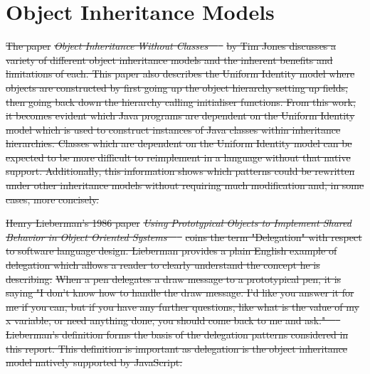 \documentclass[11pt
              , a4paper
              , twoside
              , openright
              ]{report}
\providecommand{\DIFdel}[1]{{\protect\color{red}\sout{#1}}}                      %
\providecommand{\DIFdelbegin}{} %
\begin{document}
\section{Object Inheritance Models}
\DIFdelbegin \DIFdel{The paper }\textit{\DIFdel{Object Inheritance Without Classes~\mbox{%
\cite{InheritanceWithoutClasses}
}%
}} %
\DIFdel{by Tim Jones discusses a variety of different object inheritance models and the inherent benefits and limitations of each. This paper also describes the Uniform Identity model where objects are constructed by first going up the object hierarchy setting up fields, then going back down the hierarchy calling initialiser functions. From this work, it becomes evident which Java programs are dependent on the Uniform Identity model which is used to construct instances of Java classes within inheritance hierarchies. Classes which are dependent on the Uniform Identity model can be expected to be more difficult to reimplement in a language without that native support. Additionally, this information shows which patterns could be rewritten under other inheritance models without requiring much modification and, in some cases, more concisely.
}%

\DIFdel{Henry Lieberman's 1986 paper }\textit{\DIFdel{Using Prototypical Objects to Implement Shared Behavior in Object Oriented Systems~\mbox{%
\cite{UsingPrototypicalObjects}
}%
}} %
\DIFdel{coins the term "Delegation" with respect to software language design. Lieberman provides a plain English example of delegation which allows a reader to clearly understand the concept he is describing:
}%
\DIFdel{When a pen delegates a draw message to a prototypical pen, it is saying "I don't know how to handle the draw message. I'd like you answer it for me if you can, but if you have any further questions, like what is the value of my x variable, or need anything done, you should come back to me and ask."~\mbox{%
\cite{UsingPrototypicalObjects}
}%
}%
\DIFdel{Lieberman's definition forms the basis of the delegation patterns considered in this report. This definition is important as delegation is the object inheritance model natively supported by JavaScript.
}%
\end{document}
